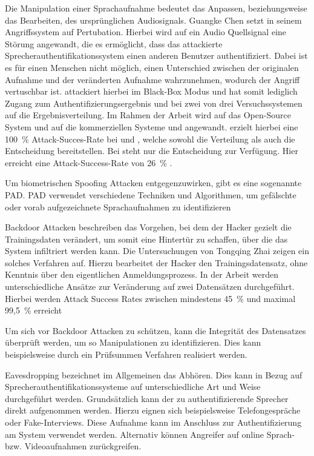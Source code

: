 Die Manipulation einer Sprachaufnahme bedeutet das Anpassen, beziehungsweise das Bearbeiten, des ursprünglichen Audiosignals.
Guangke Chen setzt in seinem Angriffssystem  auf Pertubation.
Hierbei wird auf ein Audio Quellsignal eine Störung angewandt, die es ermöglicht, dass das attackierte Sprecherauthentifikationssystem einen anderen Benutzer authentifiziert.
Dabei ist es für einen Menschen nicht möglich, einen Unterschied zwischen der originalen Aufnahme und der veränderten Aufnahme wahrzunehmen, wodurch der Angriff vertuschbar ist.
 attackiert hierbei im Black-Box Modus und hat somit lediglich Zugang zum Authentifizierungsergebnis und bei zwei von drei Versuchssystemen auf die Ergebnisverteilung.
Im Rahmen der Arbeit wird  auf das Open-Source System  und auf die kommerziellen Systeme  und  angewandt.
 erzielt hierbei eine 100~\% Attack-Succes-Rate bei  und , welche sowohl die Verteilung als auch die Entscheidung bereitstellen.
Bei  steht nur die Entscheidung zur Verfügung.
Hier erreicht  eine Attack-Success-Rate von 26~\% \autocite[vgl. ][]{chen_who_2020}.

Um biometrischen Spoofing Attacken entgegenzuwirken, gibt es eine sogenannte \ac{PAD}.
\ac{PAD} verwendet verschiedene Techniken und Algorithmen, um gefälschte oder vorab aufgezeichnete Sprachaufnahmen zu identifizieren \autocite[vgl. ][]{paravision_introduction_2022}

Backdoor Attacken beschreiben das Vorgehen, bei dem der Hacker gezielt die Trainingsdaten verändert, um somit eine Hintertür zu schaffen, über die das System infiltriert werden kann.
Die Untersuchungen von Tongqing Zhai zeigen ein solches Verfahren auf.
Hierzu bearbeitet der Hacker den Trainingsdatensatz, ohne Kenntnis über den eigentlichen Anmeldungsprozess.
In der Arbeit werden unterschiedliche Ansätze zur Veränderung auf zwei Datensätzen durchgeführt.
Hierbei werden Attack Success Rates zwischen mindestens 45~\% und maximal 99,5~\% erreicht \autocite[vgl. ][]{zhai_backdoor_2021}

Um sich vor Backdoor Attacken zu schützen, kann die Integrität des Datensatzes überprüft werden, um so Manipulationen zu identifizieren.
Dies kann beispielsweise durch ein Prüfsummen Verfahren realisiert werden.

Eavesdropping bezeichnet im Allgemeinen das Abhören.
Dies kann in Bezug auf Sprecherauthentifikationssysteme auf unterschiedliche Art und Weise durchgeführt werden.
Grundsätzlich kann der zu authentifizierende Sprecher direkt aufgenommen werden.
Hierzu eignen sich beispielsweise Telefongespräche oder Fake-Interviews.
Diese Aufnahme kann im Anschluss zur Authentifizierung am System verwendet werden.
Alternativ können Angreifer auf online Sprach- bzw. Videoaufnahmen zurückgreifen.

